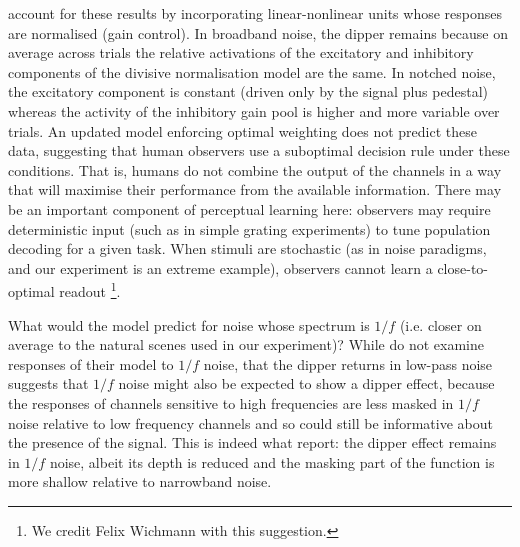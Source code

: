 \documentclass[11pt,a4paper]{article}
\begin{document}
{\citet{Goris2009} account for these results by incorporating linear-nonlinear units whose responses are normalised (gain control). 
In broadband noise, the dipper remains because on average across trials the relative activations of the excitatory and inhibitory components of the divisive normalisation model are the same.
In notched noise, the excitatory component is constant (driven only by the signal plus pedestal) whereas the activity of the inhibitory gain pool is higher and more variable over trials.
An updated model enforcing optimal weighting \citep{Goris2013} does not predict these data, suggesting that human observers use a suboptimal decision rule under these conditions.
That is, humans do not combine the output of the channels in a way that will maximise their performance from the available information.
There may be an important component of perceptual learning here: observers may require deterministic input (such as in simple grating experiments) to tune population decoding for a given task. 
When stimuli are stochastic (as in noise paradigms, and our experiment is an extreme example), observers cannot learn a close-to-optimal readout \footnote{We credit Felix Wichmann with this suggestion.}.

What would the \citet{Goris2009} model predict for noise whose spectrum is $1/f$ (i.e. closer on average to the natural scenes used in our experiment)?
While \citet{Goris2009} do not examine responses of their model to $1/f$ noise, that the dipper returns in low-pass noise \citep{Henning2007} suggests that $1/f$ noise might also be expected to show a dipper effect, because the responses of channels sensitive to high frequencies are less masked in $1/f$ noise relative to low frequency channels and so could still be informative about the presence of the signal.
This is indeed what \citet{Haun2010} report: the dipper effect remains in $1/f$ noise, albeit its depth is reduced and the masking part of the function is more shallow relative to narrowband noise.

}
\end{document}

